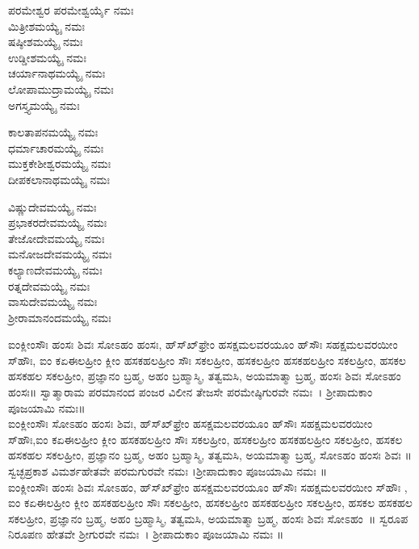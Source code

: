 ಪರಮೇಶ್ವರ ಪರಮೇಶ್ವರ್ಯೈ ನಮಃ\\
 ಮಿತ್ರೀಶಮಯ್ಯೈ ನಮಃ\\
 ಷಷ್ಠೀಶಮಯ್ಯೈ ನಮಃ\\
 ಉಡ್ಡೀಶಮಯ್ಯೈ ನಮಃ\\
 ಚರ್ಯಾನಾಥಮಯ್ಯೈ ನಮಃ\\
 ಲೋಪಾಮುದ್ರಾಮಯ್ಯೈ ನಮಃ\\
 ಅಗಸ್ತ್ಯಮಯ್ಯೈ ನಮಃ

 ಕಾಲತಾಪನಮಯ್ಯೈ ನಮಃ\\
 ಧರ್ಮಾಚಾರಮಯ್ಯೈ ನಮಃ\\
 ಮುಕ್ತಕೇಶೀಶ್ವರಮಯ್ಯೈ ನಮಃ\\
 ದೀಪಕಲಾನಾಥಮಯ್ಯೈ ನಮಃ

 ವಿಷ್ಣುದೇವಮಯ್ಯೈ ನಮಃ\\
 ಪ್ರಭಾಕರದೇವಮಯ್ಯೈ ನಮಃ\\
 ತೇಜೋದೇವಮಯ್ಯೈ ನಮಃ\\
 ಮನೋಜದೇವಮಯ್ಯೈ ನಮಃ\\
 ಕಲ್ಯಾಣದೇವಮಯ್ಯೈ ನಮಃ\\
 ರತ್ನದೇವಮಯ್ಯೈ ನಮಃ\\
 ವಾಸುದೇವಮಯ್ಯೈ ನಮಃ\\
 ಶ್ರೀರಾಮಾನಂದಮಯ್ಯೈ ನಮಃ

 ಐಂಕ್ಲೀಂಸೌಃ ಹಂಸಃ ಶಿವಃ ಸೋಽಹಂ ಹಂಸಃ, ಹ್‌ಸ್‌ಖ್‌ಫ್ರೇಂ ಹಸಕ್ಷಮಲವರಯೂಂ ಹ್‌ಸೌಃ ಸಹಕ್ಷಮಲವರಯೀಂ ಸ್‌ಹೌಃ, ಐಂ ಕಏಈಲಹ್ರೀಂ ಕ್ಲೀಂ ಹಸಕಹಲಹ್ರೀಂ ಸೌಃ  ಸಕಲಹ್ರೀಂ, ಹಸಕಲಹ್ರೀಂ ಹಸಕಹಲಹ್ರೀಂ ಸಕಲಹ್ರೀಂ, ಹಸಕಲ ಹಸಕಹಲ ಸಕಲಹ್ರೀಂ, ಪ್ರಜ್ಞಾನಂ ಬ್ರಹ್ಮ, ಅಹಂ ಬ್ರಹ್ಮಾಸ್ಮಿ, ತತ್ವಮಸಿ, ಅಯಮಾತ್ಮಾ ಬ್ರಹ್ಮ, ಹಂಸಃ ಶಿವಃ ಸೋಽಹಂ ಹಂಸಃ॥ ಸ್ವಾತ್ಮಾರಾಮ ಪರಮಾನಂದ ಪಂಜರ ವಿಲೀನ ತೇಜಸೇ ಪರಮೇಷ್ಠಿಗುರವೇ ನಮಃ~। ಶ್ರೀಪಾದುಕಾಂ ಪೂಜಯಾಮಿ ನಮಃ॥\\
 ಐಂಕ್ಲೀಂಸೌಃ ಸೋಽಹಂ ಹಂಸಃ ಶಿವಃ, ಹ್‌ಸ್‌ಖ್‌ಫ್ರೇಂ ಹಸಕ್ಷಮಲವರಯೂಂ ಹ್‌ಸೌಃ ಸಹಕ್ಷಮಲವರಯೀಂ ಸ್‌ಹೌಃ,ಐಂ ಕಏಈಲಹ್ರೀಂ ಕ್ಲೀಂ ಹಸಕಹಲಹ್ರೀಂ ಸೌಃ  ಸಕಲಹ್ರೀಂ, ಹಸಕಲಹ್ರೀಂ ಹಸಕಹಲಹ್ರೀಂ ಸಕಲಹ್ರೀಂ, ಹಸಕಲ ಹಸಕಹಲ ಸಕಲಹ್ರೀಂ, ಪ್ರಜ್ಞಾನಂ ಬ್ರಹ್ಮ, ಅಹಂ ಬ್ರಹ್ಮಾಸ್ಮಿ, ತತ್ವಮಸಿ, ಅಯಮಾತ್ಮಾ ಬ್ರಹ್ಮ,  ಸೋಽಹಂ ಹಂಸಃ ಶಿವಃ ॥ ಸ್ವಚ್ಛಪ್ರಕಾಶ ವಿಮರ್ಶಹೇತವೇ ಪರಮಗುರವೇ ನಮಃ ।ಶ್ರೀಪಾದುಕಾಂ ಪೂಜಯಾಮಿ ನಮಃ ॥\\
 ಐಂಕ್ಲೀಂಸೌಃ ಹಂಸಃ ಶಿವಃ ಸೋಽಹಂ, ಹ್‌ಸ್‌ಖ್‌ಫ್ರೇಂ ಹಸಕ್ಷಮಲವರಯೂಂ ಹ್‌ಸೌಃ ಸಹಕ್ಷಮಲವರಯೀಂ ಸ್‌ಹೌಃ , ಐಂ ಕಏಈಲಹ್ರೀಂ ಕ್ಲೀಂ ಹಸಕಹಲಹ್ರೀಂ ಸೌಃ  ಸಕಲಹ್ರೀಂ, ಹಸಕಲಹ್ರೀಂ ಹಸಕಹಲಹ್ರೀಂ ಸಕಲಹ್ರೀಂ, ಹಸಕಲ ಹಸಕಹಲ ಸಕಲಹ್ರೀಂ, ಪ್ರಜ್ಞಾನಂ ಬ್ರಹ್ಮ, ಅಹಂ ಬ್ರಹ್ಮಾಸ್ಮಿ, ತತ್ವಮಸಿ, ಅಯಮಾತ್ಮಾ ಬ್ರಹ್ಮ, ಹಂಸಃ ಶಿವಃ ಸೋಽಹಂ~॥ ಸ್ವರೂಪ ನಿರೂಪಣ ಹೇತವೇ ಶ್ರೀಗುರವೇ ನಮಃ~। ಶ್ರೀಪಾದುಕಾಂ ಪೂಜಯಾಮಿ ನಮಃ ॥

 
